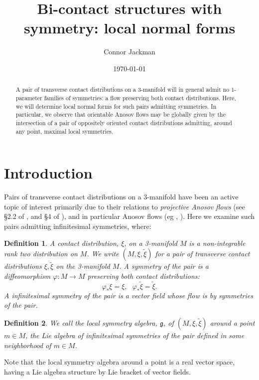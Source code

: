 \documentclass[10pt]{amsart}
\title{Bi-contact structures with symmetry: local normal forms}
\author[Connor Jackman]{Connor Jackman}
\theoremstyle{definition}
\newtheorem{dfn}{Definition}
\begin{document}
\date{\today}
\maketitle
\begin{abstract}
 A pair of transverse contact distributions on a 3-manifold will in general admit no 1-parameter families of symmetries: a flow preserving both contact distributions. Here, we will determine local normal forms for such pairs admitting symmetries. In particular, we observe that orientable Anosov flows may be globally given by the intersection of a pair of oppositely oriented contact distributions admitting, around any point, maximal local symmetries.
\end{abstract}



\section{Introduction}

Pairs of transverse contact distributions on a 3-manifold have been an active topic of interest primarily due to their relations to {\em projective Anosov flows} (see \S 2.2 of \cite{ThurstEl}, and \S 4 of \cite{Mits}), and in particular Anosov flows (eg \cite{Hoz}, \cite{Mass}). Here we examine such pairs admitting infinitesimal symmetries, where:
\begin{dfn}
{\em A {\em contact distribution}, $\xi$, on a 3-manifold $M$ is a non-integrable rank two distribution on $M$. We write $(M, \xi, \tilde \xi)$ for a pair of transverse contact distributions $\xi, \tilde \xi$ on the 3-manifold $M$. A {\em symmetry} of the pair is a diffeomorphism $\varphi:M\to M$ preserving both contact distributions:
    \[ \varphi_*\xi = \xi , ~~~\varphi_*\tilde \xi  = \tilde \xi.\]
    A {\em infinitesimal symmetry} of the pair is a vector field whose flow is by symmetries of the pair.}
\end{dfn}

\begin{dfn}
    {\em We call the {\em local symmetry algebra}, $\mathfrak{g}$, of $(M, \xi, \tilde\xi)$ around a point $m\in M$, the Lie algebra of infinitesimal symmetries of the pair defined in some neighborhood of $m\in M$.}
    \end{dfn}
    
Note that the local symmetry algebra around a point is a real vector space, having a Lie algebra structure by Lie bracket of vector fields.
\end{document}

